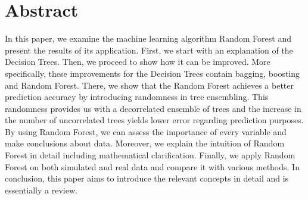 \section*{Abstract}
\thispagestyle{empty}
In this paper, we examine the machine learning algorithm Random Forest
and present the results of its application.
First, we start with an explanation of the Decision Trees.
Then, we proceed to show how it can be improved.
More specifically, these improvements for the Decision Trees contain bagging, boosting and Random Forest.
There, we show that the Random Forest achieves a better prediction accuracy
by introducing randomness in tree ensembling.
This randomness provides us with a decorrelated ensemble of trees and
the increase in the number of uncorrelated trees yields lower error regarding prediction purposes. By using Random Forest, we can assess the importance of every variable
and make conclusions about data.
Moreover, we explain the intuition of Random Forest in detail including mathematical clarification.
Finally, we apply Random Forest on both simulated and real data and compare it with various methods.
In conclusion, this paper aims to introduce the relevant concepts in detail and is essentially a review. 




